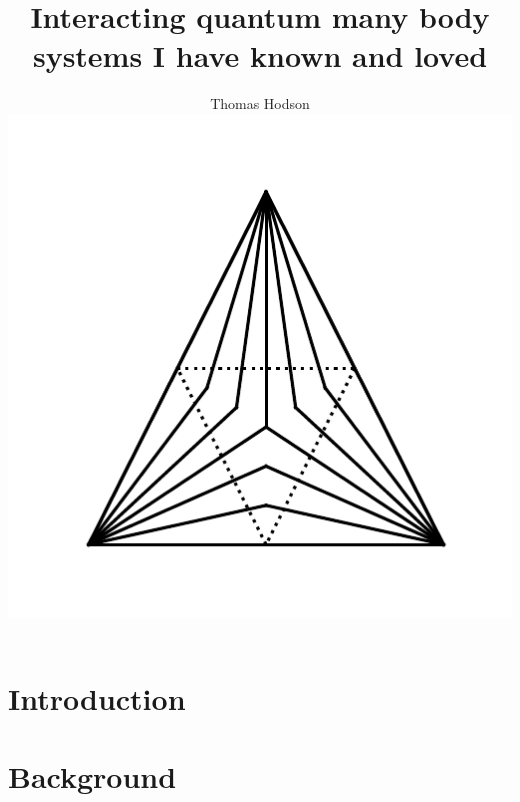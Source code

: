 \documentclass[a4paper,12pt]{report}
\begin{document}
\title{\LARGE {\bf Interacting quantum many body systems I have known and loved}\\
 \vspace*{6mm}
}

\author{Thomas Hodson\\\vspace{10mm}
\includegraphics[width=.4\textwidth,height=.4\textheight]{figure_code/logo/logo}
\vspace{-0.4\textheight}
\vspace{10mm}
}


\maketitle

\preface



% 
% 

\body
\chapter{Introduction}


\chapter{Background}




% 
% 
% 
\end{document}
